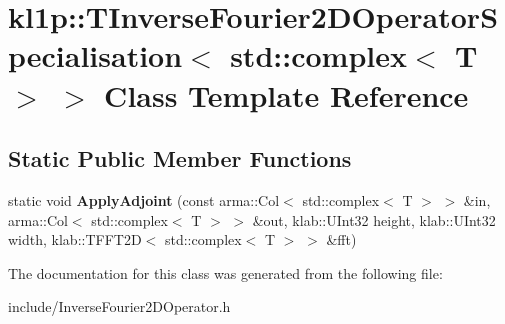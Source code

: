 \hypertarget{classkl1p_1_1TInverseFourier2DOperatorSpecialisation_3_01std_1_1complex_3_01T_01_4_01_4}{}\section{kl1p\+:\+:T\+Inverse\+Fourier2\+D\+Operator\+Specialisation$<$ std\+:\+:complex$<$ T $>$ $>$ Class Template Reference}
\label{classkl1p_1_1TInverseFourier2DOperatorSpecialisation_3_01std_1_1complex_3_01T_01_4_01_4}
\subsection*{Static Public Member Functions}
\begin{DoxyCompactItemize}
\item 
static void {\bfseries Apply\+Adjoint} (const arma\+::\+Col$<$ std\+::complex$<$ T $>$ $>$ \&in, arma\+::\+Col$<$ std\+::complex$<$ T $>$ $>$ \&out, klab\+::\+U\+Int32 height, klab\+::\+U\+Int32 width, klab\+::\+T\+F\+F\+T2D$<$ std\+::complex$<$ T $>$ $>$ \&fft)\hypertarget{classkl1p_1_1TInverseFourier2DOperatorSpecialisation_3_01std_1_1complex_3_01T_01_4_01_4_ae7996f0948e920df52340215719eff1c}{}\label{classkl1p_1_1TInverseFourier2DOperatorSpecialisation_3_01std_1_1complex_3_01T_01_4_01_4_ae7996f0948e920df52340215719eff1c}

\end{DoxyCompactItemize}


The documentation for this class was generated from the following file\+:\begin{DoxyCompactItemize}
\item 
include/Inverse\+Fourier2\+D\+Operator.\+h\end{DoxyCompactItemize}
